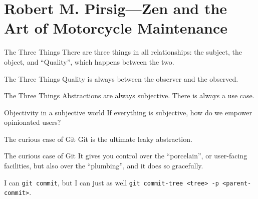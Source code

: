 \documentclass[aspectratio=169]{beamer}
\begin{document}
  \section{Robert M. Pirsig—Zen and the Art of Motorcycle Maintenance}
  \begin{frame}{The Three Things}
    There are three things in all relationships: the subject, the object, and
    “Quality”, which happens between the two.
  \end{frame}
  \begin{frame}{The Three Things}
    Quality is always between the observer and the observed.
  \end{frame}
  \begin{frame}{The Three Things}
    Abstractions are always subjective. There is always a use case.
  \end{frame}
  \begin{frame}{Objectivity in a subjective world}
    If everything is subjective, how do we empower opinionated users?
  \end{frame}
  \begin{frame}{The curious case of Git}
    Git is the ultimate leaky abstraction.
  \end{frame}
  \begin{frame}{The curious case of Git}
    It gives you control over the “porcelain”, or user-facing facilities, but
    also over the “plumbing”, and it does so gracefully.

    \small{%
      I can \texttt{git commit}, but I can just as well \texttt{git commit-tree
      <tree> -p <parent-commit>}.
    }
  \end{frame}
\end{document}
